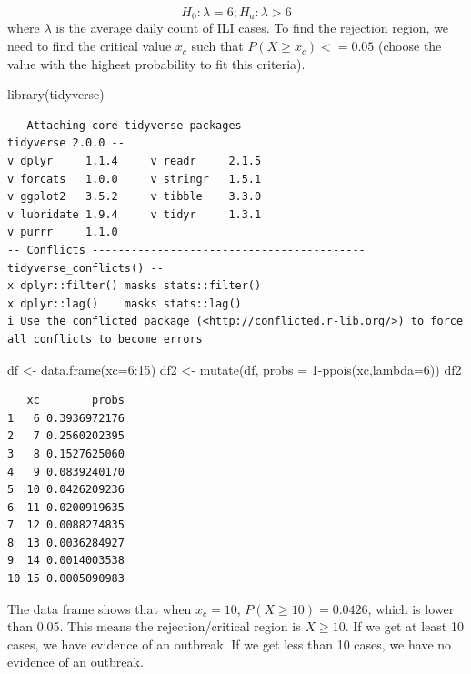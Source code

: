 \documentclass[
  letterpaper,
  DIV=11,
  numbers=noendperiod]{scrartcl}
\newenvironment{Shaded}{\begin{snugshade}}{\end{snugshade}}
\newcommand{\AttributeTok}[1]{\textcolor[rgb]{0.40,0.45,0.13}{#1}}
\newcommand{\DecValTok}[1]{\textcolor[rgb]{0.68,0.00,0.00}{#1}}
\newcommand{\FunctionTok}[1]{\textcolor[rgb]{0.28,0.35,0.67}{#1}}
\newcommand{\NormalTok}[1]{\textcolor[rgb]{0.00,0.23,0.31}{#1}}
\newcommand{\OtherTok}[1]{\textcolor[rgb]{0.00,0.23,0.31}{#1}}
\newcommand{\SpecialCharTok}[1]{\textcolor[rgb]{0.37,0.37,0.37}{#1}}
\begin{document}
\[
H_0: \lambda=6; H_a: \lambda > 6
\] where \(\lambda\) is the average daily count of ILI cases. To find
the rejection region, we need to find the critical value \(x_c\) such
that \(P(X \geq x_c) <= 0.05\) (choose the value with the highest
probability to fit this criteria).

\begin{Shaded}
\begin{Highlighting}[]
\FunctionTok{library}\NormalTok{(tidyverse)}
\end{Highlighting}
\end{Shaded}

\begin{verbatim}
-- Attaching core tidyverse packages ------------------------ tidyverse 2.0.0 --
v dplyr     1.1.4     v readr     2.1.5
v forcats   1.0.0     v stringr   1.5.1
v ggplot2   3.5.2     v tibble    3.3.0
v lubridate 1.9.4     v tidyr     1.3.1
v purrr     1.1.0     
-- Conflicts ------------------------------------------ tidyverse_conflicts() --
x dplyr::filter() masks stats::filter()
x dplyr::lag()    masks stats::lag()
i Use the conflicted package (<http://conflicted.r-lib.org/>) to force all conflicts to become errors
\end{verbatim}

\begin{Shaded}
\begin{Highlighting}[]
\NormalTok{df }\OtherTok{\textless{}{-}} \FunctionTok{data.frame}\NormalTok{(}\AttributeTok{xc=}\DecValTok{6}\SpecialCharTok{:}\DecValTok{15}\NormalTok{)}
\NormalTok{df2 }\OtherTok{\textless{}{-}} \FunctionTok{mutate}\NormalTok{(df, }\AttributeTok{probs =} \DecValTok{1}\SpecialCharTok{{-}}\FunctionTok{ppois}\NormalTok{(xc,}\AttributeTok{lambda=}\DecValTok{6}\NormalTok{))}
\NormalTok{df2}
\end{Highlighting}
\end{Shaded}

\begin{verbatim}
   xc        probs
1   6 0.3936972176
2   7 0.2560202395
3   8 0.1527625060
4   9 0.0839240170
5  10 0.0426209236
6  11 0.0200919635
7  12 0.0088274835
8  13 0.0036284927
9  14 0.0014003538
10 15 0.0005090983
\end{verbatim}

The data frame shows that when \(x_c=10\), \(P(X \geq 10) = 0.0426\),
which is lower than 0.05. This means the rejection/critical region is
\(X\geq 10\). If we get at least 10 cases, we have evidence of an
outbreak. If we get less than 10 cases, we have no evidence of an
outbreak.
\end{document}
